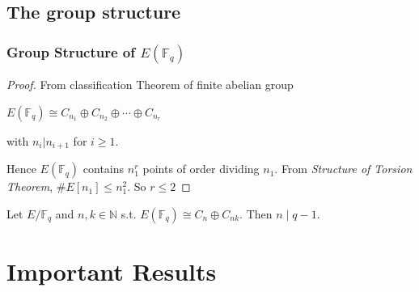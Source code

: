 \documentclass[10pt,final]{beamer} %
\newcommand{\F}{\mathbb F}
\theoremstyle{definition}
\begin{document}
\subsection{The group structure}
\begin{frame}\frametitle{Group Structure of $E(\F_q)$}

\pause

\begin{proof}
From classification Theorem of finite abelian group\\
\centerline{$E(\F_q)\cong  C_{n_1}\oplus C_{n_2}\oplus\cdots\oplus C_{n_r}$}
with $n_i|n_{i+1}$ for $i\ge1$.\pause

Hence $E(\F_q)$ contains $n_1^r$ points of order dividing $n_1$. From
\emph{Structure of Torsion Theorem}, $\#E[n_1]\le n_1^2$.
So $r\le2$\end{proof}\pause

\begin{theorem}  Let $E/\F_q$ and $n,k\in\mathbb N$ s.t.
$E(\F_q)\cong C_n\oplus C_{nk}.$
Then $n\mid q-1$.
\end{theorem}\pause
\end{frame}

\section{Important Results}
\end{document}
